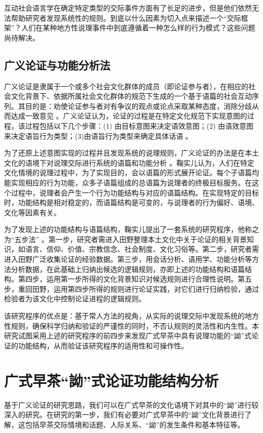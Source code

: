 \documentclass[b5paper,10.5pt,onecolumn,twoside,leqno,UTF8]{article}
\begin{document}
互动社会语言学在确定特定类型的交际事件方面有了长足的进步，但是他们依然无法帮助研究者发现系统性的规则。到底以什么因素为切入点来描述一个“交际框架”？人们在某种地方性说理事件中到底遵循着一种怎么样的行为模式？这些问题尚待解决。

\subsection{广义论证与功能分析法}

广义论证是隶属于一个或多个社会文化群体的成员（即论证参与者），在相应的社会文化背景下、依据所属社会文化群体的规范下生成的一个基于语篇的社会互动序列。其目的是：劝使论证参与者对有争议的观点或论点采取某种态度，消除分歧从而达成一致意见 。广义论证认为，论证的过程是在特定文化规范下实现意图的过程，该过程包括以下几个步骤：(1) 由目标意图来决定语效意图；(2) 由语效意图来决定语旨行为类型；(3)由语旨行为类型来确定具体话语 。

为了还原上述意图实现的过程并且发现系统的说理规则，广义论证的办法是在本土文化的语境下对说理交际进行系统的语篇和功能分析 。鞠实儿认为，人们在特定文化情境的说理过程中，为了实现目的，会以语篇的形式展开论证。每个子语篇均能实现相应的行为功能，众多子语篇组成的总语篇为说理者的终极目标服务。在这个过程中，说理者会产生一个行为功能结构与对应的语篇结构。在实现特定的目标时，功能结构是相对稳定的，而语篇结构是可变的，与说理者的行为偏好、语境、文化等因素有关。

为了发现上述的功能结构与语篇结构，鞠实儿提出了一套系统的研究程序，他称之为“五步法” 。第一步，研究者需进入田野整理本土文化中关于论证的相关背景知识，如语言、信仰、价值、宗教信念、社会制度、文化习俗等。第二步，研究者需进入田野广泛收集论证的经验数据。第三步，用会话分析、语用学、功能分析等方法分析数据，在此基础上归纳出候选的逻辑规则，亦即上述的功能结构和语篇结构。第四步，运用第一步所得的文化背景知识对候选规则进行合理性说明。第五步，重回田野，运用第四步所得的规则进行论证实践，对它们进行归纳检验，通过检验者为该文化中控制论证进程的逻辑规则。

该研究程序的优点是：基于常人方法的视角，从实际的说理交际中发现系统的地方性规则，确保科学归纳和验证的严谨性的同时，不否认规则的灵活性和内生性。本研究试图采用上述的研究程序的前四步来发现广式早茶中具有说理功能的“詏”式论证的功能结构，从而验证该研究程序的适用性和可操作性。

\section{广式早茶“詏”式论证功能结构分析}

基于广义论证的研究思路，我们可以在广式早茶的文化语境下对其中的“詏”进行较深入的研究。在研究的第一步，我们有必要对广式早茶中的“詏”文化背景进行了解，这包括早茶交际情境和话题、人际关系、“詏”的发生条件和基本特征等。
\end{document}
